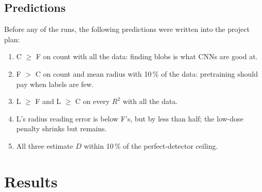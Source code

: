 \documentclass[11pt,a4paper]{article}
\newcommand{\F}{\textsf{F}}
\newcommand{\C}{\textsf{C}}
\newcommand{\Lo}{\textsf{L}}
\begin{document}
\subsection{Predictions}

Before any of the runs, the following predictions were written into the project plan:
\begin{enumerate}
  \item \C{} $\ge$ \F{} on count with all the data: finding blobs is what CNNs are
        good at.
  \item \F{} $>$ \C{} on count and mean radius with 10\,\% of the data: pretraining
        should pay when labels are few.
  \item \Lo{} $\ge$ \F{} and \Lo{} $\ge$ \C{} on every $R^2$ with all the data.
  \item \Lo{}'s radius reading error is below \F{}'s, but by less than half; the
        low-dose penalty shrinks but remains.
  \item All three estimate $D$ within 10\,\% of the perfect-detector ceiling.
\end{enumerate}

\section{Results}
\end{document}
